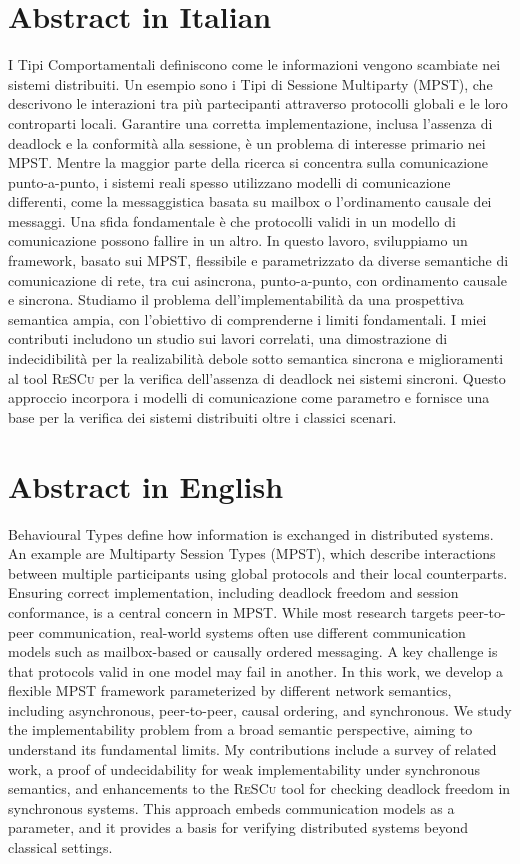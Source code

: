 \documentclass[12pt,a4paper,twoside]{book}
\theoremstyle{definition}
\theoremstyle{definition}
\theoremstyle{definition}
\begin{document}
\chapter*{Abstract in Italian}
I Tipi Comportamentali definiscono come le informazioni vengono scambiate nei
sistemi distribuiti. Un esempio sono i Tipi di Sessione Multiparty (MPST),
che descrivono le interazioni tra più partecipanti attraverso protocolli globali
e le loro controparti locali. Garantire una corretta implementazione, inclusa
l’assenza di deadlock e la conformità alla sessione, è un problema di interesse
primario nei MPST.  
Mentre la maggior parte della ricerca si concentra sulla comunicazione
punto-a-punto, i sistemi reali spesso utilizzano modelli di comunicazione
differenti, come la messaggistica basata su mailbox o l’ordinamento
causale dei messaggi. Una sfida fondamentale è che protocolli validi in un
modello di comunicazione possono fallire in un altro.  
In questo lavoro, sviluppiamo un framework, basato sui MPST,
flessibile e parametrizzato da diverse
semantiche di comunicazione di rete, tra cui asincrona, punto-a-punto, con ordinamento
causale e sincrona. Studiamo il problema dell’implementabilità da una
prospettiva semantica ampia, con l’obiettivo di comprenderne i limiti
fondamentali. I miei contributi includono un studio sui lavori correlati, una
dimostrazione di indecidibilità per la realizabilità debole sotto semantica
sincrona e miglioramenti al tool \textsc{ReSCu} per la verifica
dell’assenza di deadlock nei sistemi sincroni.  
Questo approccio incorpora i modelli di comunicazione come parametro e fornisce
una base per la verifica dei sistemi distribuiti oltre i classici scenari. 
\thispagestyle{plain}
\topmargin=-1cm
\cleardoublepage

{}
\chapter*{Abstract in English}
Behavioural Types define how information is exchanged in distributed systems.
An example are Multiparty Session Types (MPST), which describe interactions between 
multiple participants
using global protocols and their local counterparts. Ensuring correct implementation,
including deadlock freedom and session conformance, is a central concern in MPST.
While most research targets peer-to-peer communication, real-world systems often
use different communication models such as mailbox-based or causally ordered messaging.
A key challenge is that protocols valid in one model may fail in another.
In this work, we develop a flexible MPST framework parameterized by different network
semantics, including asynchronous, peer-to-peer, causal ordering, and synchronous.
We study the implementability problem from a broad semantic perspective, aiming to
understand its fundamental limits. My contributions include a survey
of related work, a proof of undecidability for weak implementability under synchronous
semantics, and enhancements to the \textsc{ReSCu} tool for checking deadlock freedom in
synchronous systems. This approach embeds communication models as a parameter, and it
provides a basis for verifying distributed systems beyond classical settings.
\end{document}

